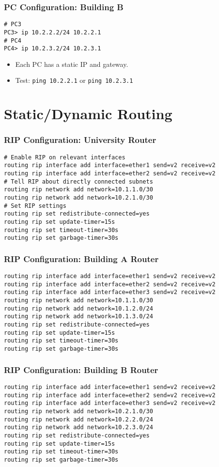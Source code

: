 \documentclass{beamer}
\begin{document}
\begin{frame}[fragile]
\frametitle{PC Configuration: Building B}
\begin{lstlisting}
# PC3
PC3> ip 10.2.2.2/24 10.2.2.1
# PC4
PC4> ip 10.2.3.2/24 10.2.3.1
\end{lstlisting}
\begin{itemize}
    \item Each PC has a static IP and gateway.
    \item Test: \texttt{ping 10.2.2.1} or \texttt{ping 10.2.3.1}
\end{itemize}
\end{frame}

\section{Static/Dynamic Routing}

\begin{frame}[fragile,label=routing]
\frametitle{RIP Configuration: University Router}
\begin{lstlisting}
# Enable RIP on relevant interfaces
routing rip interface add interface=ether1 send=v2 receive=v2
routing rip interface add interface=ether2 send=v2 receive=v2
# Tell RIP about directly connected subnets
routing rip network add network=10.1.1.0/30
routing rip network add network=10.2.1.0/30
# Set RIP settings
routing rip set redistribute-connected=yes
routing rip set update-timer=15s
routing rip set timeout-timer=30s
routing rip set garbage-timer=30s
\end{lstlisting}
\end{frame}

\begin{frame}[fragile]
\frametitle{RIP Configuration: Building A Router}
\begin{lstlisting}
routing rip interface add interface=ether1 send=v2 receive=v2
routing rip interface add interface=ether2 send=v2 receive=v2
routing rip interface add interface=ether3 send=v2 receive=v2
routing rip network add network=10.1.1.0/30
routing rip network add network=10.1.2.0/24
routing rip network add network=10.1.3.0/24
routing rip set redistribute-connected=yes
routing rip set update-timer=15s
routing rip set timeout-timer=30s
routing rip set garbage-timer=30s
\end{lstlisting}
\end{frame}

\begin{frame}[fragile]
\frametitle{RIP Configuration: Building B Router}
\begin{lstlisting}
routing rip interface add interface=ether1 send=v2 receive=v2
routing rip interface add interface=ether2 send=v2 receive=v2
routing rip interface add interface=ether3 send=v2 receive=v2
routing rip network add network=10.2.1.0/30
routing rip network add network=10.2.2.0/24
routing rip network add network=10.2.3.0/24
routing rip set redistribute-connected=yes
routing rip set update-timer=15s
routing rip set timeout-timer=30s
routing rip set garbage-timer=30s
\end{lstlisting}
\end{frame}
\end{document}
